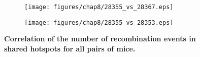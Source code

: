 \begin{figure}[p]
    \centering
   
	\begin{subfigure}[b]{0.75\textwidth}
        \texttt{[image: figures/chap8/28355\_vs\_28367.eps]}
    \end{subfigure}

    \vspace{0.5cm}
    
	\begin{subfigure}[b]{0.75\textwidth}
        \texttt{[image: figures/chap8/28355\_vs\_28353.eps]}
    \end{subfigure}


    \caption[Correlation of the number of recombination events in shared hotspots for all pairs of mice]
    {\textbf{Correlation of the number of recombination events in shared hotspots for all pairs of mice.}
    }
\label{fig:pairwise-RR-shared-BIS2}
\end{figure}











